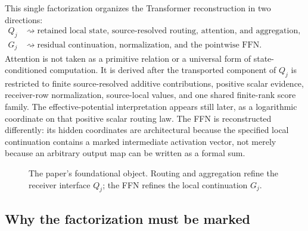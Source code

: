 This single factorization organizes the Transformer reconstruction in two directions:
\[
\boxed{
\begin{aligned}
Q_j
&\rightsquigarrow
\text{retained local state, source-resolved routing, attention, and aggregation},\\
G_j
&\rightsquigarrow
\text{residual continuation, normalization, and the pointwise FFN}.
\end{aligned}}
\]
Attention is not taken as a primitive relation or a universal form of state-conditioned computation. It is derived after the transported component of $Q_j$ is restricted to finite source-resolved additive contributions, positive scalar evidence, receiver-row normalization, source-local values, and one shared finite-rank score family. The effective-potential interpretation appears still later, as a logarithmic coordinate on that positive scalar routing law. The FFN is reconstructed differently: its hidden coordinates are architectural because the specified local continuation contains a marked intermediate activation vector, not merely because an arbitrary output map can be written as a formal sum.

\begin{figure}[t]
\centering
{}
\caption{The paper's foundational object. Routing and aggregation refine the receiver interface $Q_j$; the FFN refines the local continuation $G_j$.}
\label{fig:central-factorization}
\end{figure}

\subsection{Why the factorization must be marked}

